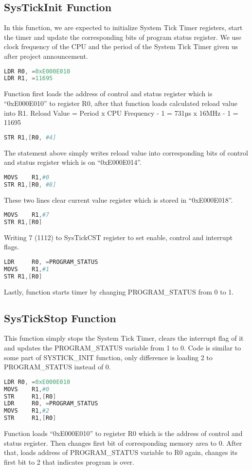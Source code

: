 \documentclass[pdftex,12pt,a4paper]{article}
\begin{document}
\subsection{SysTickInit Function}
In this function, we are expected to initialize System Tick Timer registers, start the timer and update the corresponding bits of program status register. We use clock frequency of the CPU and the period of the System Tick Timer given us after project announcement.
\begin{lstlisting}[language=Assembler]
LDR	R0, =0xE000E010
LDR	R1, =11695
\end{lstlisting}
Function first loads the address of control and status register which is “0xE000E010” to register R0, after that  function loads calculated reload value into R1.
Reload Value = Period x CPU Frequency - 1 = 731µs x 16MHz - 1 = 11695
\begin{lstlisting}[language=Assembler]
STR	R1,[R0, #4]
\end{lstlisting}
The statement above simply writes reload value into corresponding bits of control and status register which is on “0xE000E014”.
\begin{lstlisting}[language=Assembler]
MOVS	R1,#0
STR	R1,[R0, #8]
\end{lstlisting}
These two lines clear current value register which is stored in “0xE000E018”.
\begin{lstlisting}[language=Assembler]
MOVS	R1,#7
STR	R1,[R0]
\end{lstlisting}
Writing 7 (1112) to SysTickCST register to set enable, control and interrupt flags.
\begin{lstlisting}[language=Assembler]
LDR 	R0, =PROGRAM_STATUS
MOVS 	R1,#1
STR	R1,[R0]
\end{lstlisting}
Lastly, function starts timer by changing PROGRAM\_STATUS from 0 to 1.

\subsection{SysTickStop Function}
This function simply stops the System Tick Timer, clears the interrupt flag of it and updates the PROGRAM\_STATUS variable from 1 to 0.
Code is similar to some part of SYSTICK\_INIT function, only difference is loading 2 to PROGRAM\_STATUS instead of 0.
\begin{lstlisting}[language=Assembler]
LDR	R0, =0xE000E010
MOVS 	R1,#0
STR 	R1,[R0]
LDR 	R0, =PROGRAM_STATUS 
MOVS 	R1,#2
STR 	R1,[R0] 
\end{lstlisting}
Function loads “0xE000E010” to register R0 which is the address of control and status register. Then changes first bit of corresponding memory area to 0. After that, loads address of PROGRAM\_STATUS variable to R0 again, changes its first bit to 2 that indicates program is over.
\end{document}
